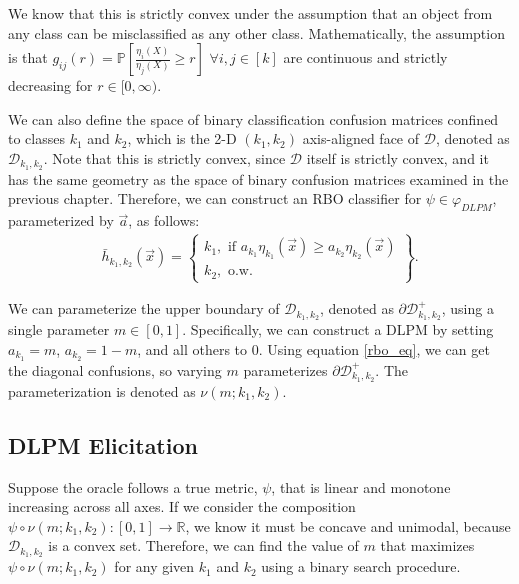 \documentclass[
  letterpaper,
  DIV=11,
  numbers=noendperiod,
  oneside]{scrreprt}
\theoremstyle{remark}
\begin{document}
We know that this is strictly convex under the assumption that an object
from any class can be misclassified as any other class. Mathematically,
the assumption is that
\(g_{ij}(r) = \mathbb{P} \left[\frac{\eta_i(X)}{\eta_j(X)} \geq r \right]\)
\(\forall i, j \in [k]\) are continuous and strictly decreasing for
\(r \in [0, \infty)\).

We can also define the space of binary classification confusion matrices
confined to classes \(k_1\) and \(k_2\), which is the 2-D \((k_1, k_2)\)
axis-aligned face of \(\mathcal{D}\), denoted as
\(\mathcal{D}_{k_1, k_2}\). Note that this is strictly convex, since
\(\mathcal{D}\) itself is strictly convex, and it has the same geometry
as the space of binary confusion matrices examined in the previous
chapter. Therefore, we can construct an RBO classifier for
\(\psi \in \varphi_{DLPM}\), parameterized by \(\vec{a}\), as follows:
\[\begin{aligned}
\bar{h}_{k_1, k_2}(\vec{x})= \left\{
\begin{array}{ll}
      k_1, \text{ if } a_{k_1} \eta_{k_1}(\vec{x}) \geq a_{k_2} \eta_{k_2}(\vec{x})\\
k_2, \text{ o.w.}
\end{array}
\right\}.
\label{rbo_eq}
\end{aligned}\]

We can parameterize the upper boundary of \(\mathcal{D}_{k_1, k_2}\),
denoted as \(\partial \mathcal{D}^{+}_{k_1, k_2}\), using a single
parameter \(m \in [0, 1]\). Specifically, we can construct a DLPM by
setting \(a_{k_1} = m\), \(a_{k_2} = 1 - m\), and all others to 0. Using
equation \hyperref[rbo_eq]{{[}rbo\_eq{]}}, we can get the diagonal
confusions, so varying \(m\) parameterizes
\(\partial \mathcal{D}^{+}_{k_1, k_2}\). The parameterization is denoted
as \(\nu(m; k_1, k_2)\).

\subsection{DLPM Elicitation}\label{dlpm-elicitation}

Suppose the oracle follows a true metric, \(\psi\), that is linear and
monotone increasing across all axes. If we consider the composition
\(\psi \circ \nu(m; k_1, k_2): [0, 1] \rightarrow \mathbb{R}\), we know
it must be concave and unimodal, because \(\mathcal{D}_{k_1, k_2}\) is a
convex set. Therefore, we can find the value of \(m\) that maximizes
\(\psi \circ \nu(m; k_1, k_2)\) for any given \(k_1\) and \(k_2\) using
a binary search procedure.
\end{document}

